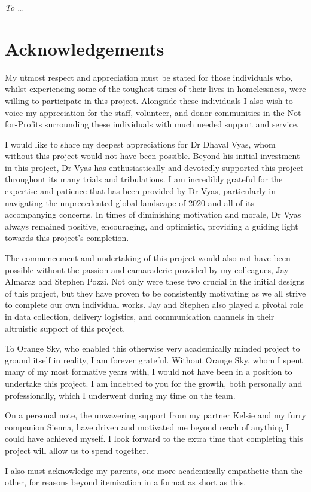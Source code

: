 \vspace*{70mm}
\begin{center}
    \renewcommand{\baselinestretch}{1.0}
    \sl
    To \ldots
\end{center}

\chapter{Acknowledgements}

My utmost respect and appreciation must be stated for those individuals who, whilst experiencing some of the toughest times of their lives in homelessness, were willing to participate in this project. Alongside these individuals I also wish to voice my appreciation for the staff, volunteer, and donor communities in the Not-for-Profits surrounding these individuals with much needed support and service.

I would like to share my deepest appreciations for Dr Dhaval Vyas, whom without this project would not have been possible. Beyond his initial investment in this project, Dr Vyas has enthusiastically and devotedly supported this project throughout its many trials and tribulations. I am incredibly grateful for the expertise and patience that has been provided by Dr Vyas, particularly in navigating the unprecedented global landscape of 2020 and all of its accompanying concerns. In times of diminishing motivation and morale, Dr Vyas always remained positive, encouraging, and optimistic, providing a guiding light towards this project's completion.

The commencement and undertaking of this project would also not have been possible without the passion and camaraderie provided by my colleagues, Jay Almaraz and Stephen Pozzi. Not only were these two crucial in the initial designs of this project, but they have proven to be consistently motivating as we all strive to complete our own individual works. Jay and Stephen also played a pivotal role in data collection, delivery logistics, and communication channels in their altruistic support of this project.

To Orange Sky, who enabled this otherwise very academically minded project to ground itself in reality, I am forever grateful. Without Orange Sky, whom I spent many of my most formative years with, I would not have been in a position to undertake this project. I am indebted to you for the growth, both personally and professionally, which I underwent during my time on the team.

On a personal note, the unwavering support from my partner Kelsie and my furry companion Sienna, have driven and motivated me beyond reach of anything I could have achieved myself. I look forward to the extra time that completing this project will allow us to spend together.

I also must acknowledge my parents, one more academically empathetic than the other, for reasons beyond itemization in a format as short as this. 

\cleardoublepage